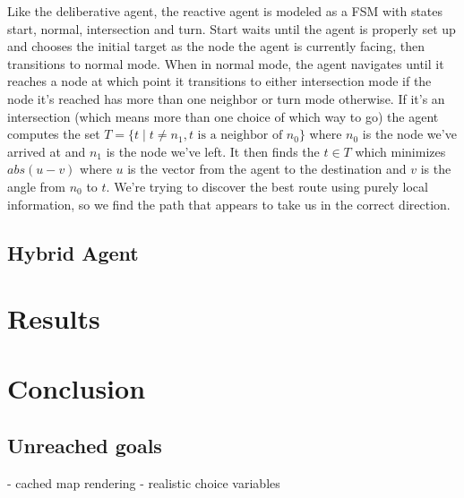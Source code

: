 \documentclass{article}
\begin{document}
Like the deliberative agent, the reactive agent is modeled
as a FSM with states start, normal, intersection and turn. Start
waits until the agent is properly set up and chooses the initial
target as the node the agent is currently facing, then transitions to
normal mode. When in normal mode, the agent navigates until it
reaches a node at which point it transitions to either intersection
mode if the node it's reached has more than one neighbor or turn mode
otherwise. If it's an intersection (which means more than one choice
of which way to go) the agent computes the set $T = \{t\;|\;t\neq
n_1,t \mbox{ is a neighbor of } n_0\}$ where $n_0$ is the node we've
arrived at and $n_1$ is the node we've left. It then finds the $t\in
T$ which minimizes $abs(u-v)$ where $u$ is the vector from the agent
to the destination and $v$ is the angle from $n_0$ to $t$. We're
trying to discover the best route using purely local information, so
we find the path that appears to take us in the correct direction.

\subsection{Hybrid Agent}

\section{Results}

\section{Conclusion}
\subsection{Unreached goals}
- cached map rendering
- realistic choice variables
\end{document}
